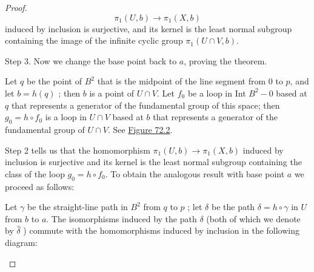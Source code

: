 \begin{proof}
\[
{\pi }_{1}( {U,b}) \rightarrow {\pi }_{1}( {X,b})
\]
induced by inclusion is surjective, and its kernel is the least normal subgroup containing the image of the infinite cyclic group \({\pi }_{1}( {U \cap V,b})\).

Step 3. Now we change the base point back to \(a\), proving the theorem.

Let \(q\) be the point of \(B^{2}\) that is the midpoint of the line segment from 0 to \(p\), and let \(b = h( q)\) ; then \(b\) is a point of \(U \cap V\). Let \(f_{0}\) be a loop in Int \(B^{2} - 0\) based at \(q\) that represents a generator of the fundamental group of this space; then \(g_{0} = h \circ {f}_{0}\) is a loop in \(U \cap V\) based at \(b\) that represents a generator of the fundamental group of \(U \cap V\). See \hyperref[fig:72.2]{Figure 72.2}.

Step 2 tells us that the homomorphism \({\pi }_{1}( {U,b}) \rightarrow {\pi }_{1}( {X,b})\) induced by inclusion is surjective and its kernel is the least normal subgroup containing the class of the loop \(g_{0} = h \circ {f}_{0}\). To obtain the analogous result with base point \(a\) we proceed as follows:

Let \(\gamma\) be the straight-line path in \(B^{2}\) from \(q\) to \(p\) ; let \(\delta\) be the path \(\delta = h \circ \gamma\) in \(U\) from \(b\) to \(a\). The isomorphisms induced by the path \(\delta\) (both of which we denote by \(\hat{\delta }\) ) commute with the homomorphisms induced by inclusion in the following diagram:

\par\nopagebreak
\begin{center}
	\label{fig:com_72_10}
\end{center}
\par\nopagebreak 


\end{proof}
